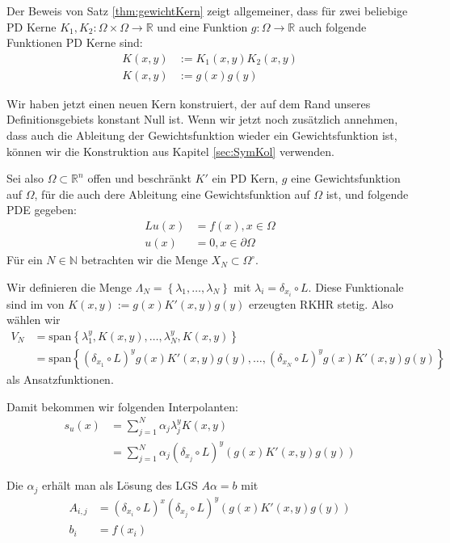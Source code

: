 \begin{remark}
Der Beweis von Satz \ref{thm:gewichtKern} zeigt allgemeiner, dass für zwei beliebige \ac{PD} Kerne $K_1, K_2: \Omega \times \Omega \rightarrow \mathbb{R}$ und eine Funktion $g: \Omega \rightarrow \mathbb{R}$ auch folgende Funktionen \ac{PD} Kerne sind:
\begin{align*}
K(x,y) &:= K_1(x,y)K_2(x,y)\\
K(x,y) &:= g(x)g(y)
\end{align*}
\end{remark}
Wir haben jetzt einen neuen Kern konstruiert, der auf dem Rand unseres Definitionsgebiets konstant Null ist. Wenn wir jetzt noch zusätzlich annehmen, dass auch die Ableitung der Gewichtsfunktion wieder ein Gewichtsfunktion ist, können wir die Konstruktion aus Kapitel \ref{sec:SymKol} verwenden. 

Sei also $\Omega \subset \mathbb{R}^n$ offen und beschränkt $K'$ ein \ac{PD} Kern, $g$ eine Gewichtsfunktion auf $\Omega$, für die auch dere Ableitung eine Gewichtsfunktion auf $\Omega$ ist, und folgende \ac{PDE} gegeben:
\begin{align*}
Lu(x) &= f(x), x \in \Omega\\
u(x) &= 0 , x \in \partial \Omega
\end{align*}
Für ein $N \in \mathbb{N}$ betrachten wir die Menge $X_N \subset \Omega^\circ$.

Wir definieren die Menge $\Lambda_N = \left\{ \lambda_1, \dots, \lambda_N\right\}$ mit $\lambda_i =  \delta_{x_i} \circ L$. Diese Funktionale sind im von $K(x,y) := g(x) K'(x,y) g(y)$ erzeugten \ac{RKHR} stetig. Also wählen wir 
\begin{align*}
V_N &= \text{span} \left\{\lambda_1^y ,K(x,y), \dots, \lambda_N^y, K(x,y)\right\}\\
&= \text{span} \left\{(\delta_{x_1} \circ L)^y g(x) K'(x,y) g(y), \dots, (\delta_{x_N} \circ L)^y g(x) K'(x,y) g(y)\right\}
\end{align*}
als Ansatzfunktionen.

Damit bekommen wir folgenden Interpolanten:
\begin{align*}
s_u(x) &= \sum_{j=1}^N \alpha_j \lambda_j^y K(x,y)\\
&= \sum_{j=1}^N \alpha_j (\delta_{x_j} \circ L)^y( g(x)K'(x,y)g(y))
\end{align*}

Die $\alpha_j$ erhält man als Lösung des \ac{LGS} $A\alpha = b$ mit 
\begin{align*}
A_{i,j} &= (\delta_{x_i} \circ L)^x (\delta_{x_j} \circ L)^y (g(x)K'(x,y)g(y))\\
b_i &= f(x_i)
\end{align*}

